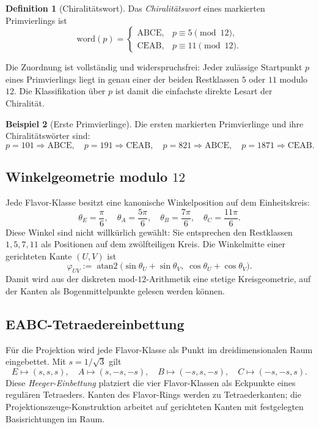 \documentclass[11pt,a4paper]{article}
\theoremstyle{definition}
\newtheorem{definition}{Definition}[section]
\newtheorem{beispiel}[definition]{Beispiel}
\theoremstyle{plain}
\begin{document}
	\begin{definition}[Chiralitätswort]
		Das \emph{Chiralitätswort} eines markierten Primvierlings ist
		\[
		\mathrm{word}(p)=
		\begin{cases}
			\mathrm{ABCE}, & p\equiv 5\pmod{12},\\[4pt]
			\mathrm{CEAB}, & p\equiv 11\pmod{12}.
		\end{cases}
		\]
	\end{definition}
	
	Die Zuordnung ist vollständig und widerspruchsfrei: Jeder zulässige Startpunkt $p$ eines Primvierlings liegt in genau einer der beiden Restklassen $5$ oder $11$ modulo~$12$. Die Klassifikation über $p$ ist damit die einfachste direkte Lesart der Chiralität.
	
	\begin{beispiel}[Erste Primvierlinge]
		Die ersten markierten Primvierlinge und ihre Chiralitätswörter sind:
		\[
		p=101\Rightarrow \mathrm{ABCE},\quad
		p=191\Rightarrow \mathrm{CEAB},\quad
		p=821\Rightarrow \mathrm{ABCE},\quad
		p=1871\Rightarrow \mathrm{CEAB}.
		\]
	\end{beispiel}
	
	\subsection{Winkelgeometrie modulo $12$}
	
	Jede Flavor-Klasse besitzt eine kanonische Winkelposition auf dem Einheitskreis:
	\[
	\theta_E=\frac{\pi}{6},\quad
	\theta_A=\frac{5\pi}{6},\quad
	\theta_B=\frac{7\pi}{6},\quad
	\theta_C=\frac{11\pi}{6}.
	\]
	Diese Winkel sind nicht willkürlich gewählt: Sie entsprechen den Restklassen $1,5,7,11$ als Positionen auf dem zwölfteiligen Kreis. Die Winkelmitte einer gerichteten Kante $(U,V)$ ist
	\[
	\varphi_{UV}:=\operatorname{atan2}\bigl(\sin\theta_U+\sin\theta_V,\;\cos\theta_U+\cos\theta_V\bigr).
	\]
	Damit wird aus der diskreten mod-$12$-Arithmetik eine stetige Kreisgeometrie, auf der Kanten als Bogenmittelpunkte gelesen werden können.
	
	\subsection{EABC-Tetraedereinbettung}
	
	Für die Projektion wird jede Flavor-Klasse als Punkt im dreidimensionalen Raum eingebettet. Mit $s=1/\sqrt{3}$ gilt
	\[
	E\mapsto (s,s,s),\quad
	A\mapsto (s,-s,-s),\quad
	B\mapsto (-s,s,-s),\quad
	C\mapsto (-s,-s,s).
	\]
	Diese \emph{Heeger-Einbettung} platziert die vier Flavor-Klassen als Eckpunkte eines regulären Tetraeders. Kanten des Flavor-Rings werden zu Tetraederkanten; die Projektionszeuge-Konstruktion arbeitet auf gerichteten Kanten mit festgelegten Basisrichtungen im Raum.
	
\end{document}

